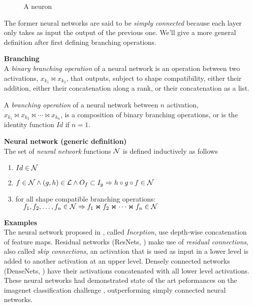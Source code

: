\begin{figure}[H]
\centering
{}
\caption{A neuron}
\label{fig:neuron}
\end{figure}


The former neural networks are said to be \emph{simply connected} because each layer only takes as input the output of the previous one. We'll give a more general definition after first defining branching operations.

\begin{definition}\textbf{Branching}\\
A \emph{binary branching operation} of a neural network is an operation between two activations, $x_{k_1} \Join x_{k_2}$, that outputs, subject to shape compatibility, either their addition, either their concatenation along a rank, or their concatenation as a list.

A \emph{branching operation} of a neural network between $n$ activation, $x_{k_1} \Join x_{k_2} \Join \cdots \Join x_{k_n}$, is a composition of binary branching operations, or is the identity function $Id$ if $n = 1$.
\end{definition}

\begin{definition}\textbf{Neural network (generic definition)}\\
The set of \emph{neural network} functions $\mathcal{N}$ is defined inductively as follows
\begin{enumerate}
  \item $Id \in \mathcal{N}$
  \item $f \in \mathcal{N} \wedge (g,h) \in \mathcal{L} \wedge O_f \subset I_g \Rightarrow h \circ g \circ f \in \mathcal{N}$
  \item for all shape compatible branching operations:\\
  $\quad f_1, f_2, \ldots, f_n \in \mathcal{N} \Rightarrow  f_1 \Join f_2 \Join \cdots \Join f_n \in \mathcal{N}$
\end{enumerate}
\label{def:nn2}
\end{definition}

\begin{remark}\textbf{Examples}\\
The neural network proposed in \citep{szegedy2015going}, called \emph{Inception}, use depth-wise concatenation of feature maps. Residual networks (ResNets, \cite{he2016deep}) make use of \emph{residual connections}, also called \emph{skip connections}, \ie an activation that is used as input in a lower level is added to another activation at an upper level. Densely connected networks (DenseNets, \cite{huang2017densely}) have their activations concatenated with all lower level activations. These neural networks had demonstrated state of the art peformances on the imagenet classification challenge \citep{deng2009imagenet}, outperforming simply connected neural networks.
\label{rem:branching_ex}
\end{remark}

